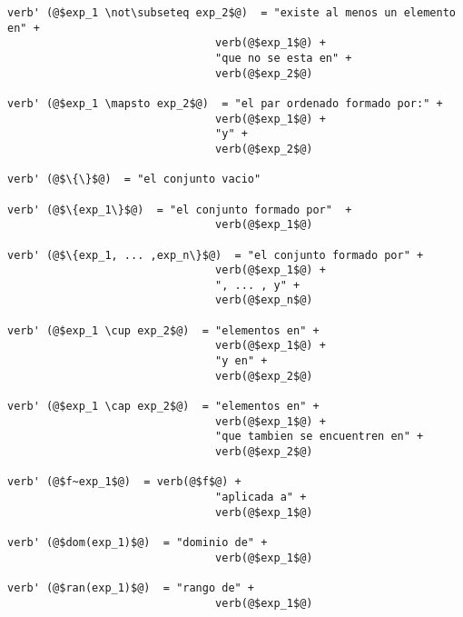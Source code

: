 \documentclass{article}
\begin{document}
\begin{verbatim}
verb' (@$exp_1 \not\subseteq exp_2$@)  = "existe al menos un elemento en" +  
                                verb(@$exp_1$@) +  
                                "que no se esta en" +  
                                verb(@$exp_2$@) 

verb' (@$exp_1 \mapsto exp_2$@)  = "el par ordenado formado por:" +  
                                verb(@$exp_1$@) +  
                                "y" +  
                                verb(@$exp_2$@) 

verb' (@$\{\}$@)  = "el conjunto vacio" 

verb' (@$\{exp_1\}$@)  = "el conjunto formado por"  +  
                                verb(@$exp_1$@) 

verb' (@$\{exp_1, ... ,exp_n\}$@)  = "el conjunto formado por" +  
                                verb(@$exp_1$@) +  
                                ", ... , y" +  
                                verb(@$exp_n$@) 

verb' (@$exp_1 \cup exp_2$@)  = "elementos en" +  
                                verb(@$exp_1$@) +  
                                "y en" +  
                                verb(@$exp_2$@) 

verb' (@$exp_1 \cap exp_2$@)  = "elementos en" +  
                                verb(@$exp_1$@) +  
                                "que tambien se encuentren en" +  
                                verb(@$exp_2$@) 

verb' (@$f~exp_1$@)  = verb(@$f$@) +  
                                "aplicada a" +  
                                verb(@$exp_1$@) 

verb' (@$dom(exp_1)$@)  = "dominio de" +  
                                verb(@$exp_1$@) 

verb' (@$ran(exp_1)$@)  = "rango de" +  
                                verb(@$exp_1$@)  
\end{verbatim}
\end{document}
